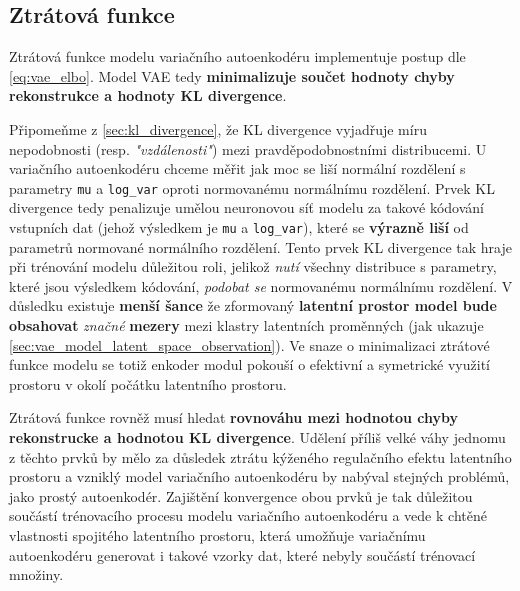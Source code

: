 \subsection{Ztrátová funkce}
\label{sec:vae_model_loss_function}
Ztrátová funkce modelu variačního autoenkodéru implementuje postup dle \autoref{eq:vae_elbo}.
Model VAE tedy \textbf{minimalizuje součet hodnoty chyby rekonstrukce a hodnoty KL divergence}.

Připomeňme z \autoref{sec:kl_divergence}, že KL divergence vyjadřuje míru nepodobnosti (resp. \emph{"vzdálenosti"}) mezi pravděpodobnostními distribucemi.
U variačního autoenkodéru chceme měřit jak moc se liší normální rozdělení s parametry \lstinline{mu} a \lstinline{log_var} oproti normovanému normálnímu rozdělení.
Prvek KL divergence tedy penalizuje umělou neuronovou síť modelu za takové kódování vstupních dat (jehož výsledkem je \lstinline{mu} a \lstinline{log_var}), které se \textbf{výrazně liší} od parametrů normované normálního rozdělení.
Tento prvek KL divergence tak hraje při trénování modelu důležitou roli, jelikož \emph{nutí} všechny distribuce s parametry, které jsou výsledkem kódování, \emph{podobat se} normovanému normálnímu rozdělení. 
V důsledku existuje \textbf{menší šance} že zformovaný \textbf{latentní prostor model bude obsahovat} \emph{značné} \textbf{mezery} mezi klastry latentních proměnných (jak ukazuje \autoref{sec:vae_model_latent_space_observation}).
Ve snaze o minimalizaci ztrátové funkce modelu se totiž enkoder modul pokouší o efektivní a symetrické využití prostoru v okolí počátku latentního prostoru.

Ztrátová funkce rovněž musí hledat \textbf{rovnováhu mezi hodnotou chyby rekonstrucke a hodnotou KL divergence}.
Udělení příliš velké váhy jednomu z těchto prvků by mělo za důsledek ztrátu kýženého regulačního efektu latentního prostoru a vzniklý model variačního autoenkodéru by nabýval stejných problémů, jako prostý autoenkodér.
Zajištění konvergence obou prvků je tak důležitou součástí trénovacího procesu modelu variačního autoenkodéru a vede k chtěné vlastnosti spojitého latentního prostoru, která umožňuje variačnímu autoenkodéru generovat i takové vzorky dat, které nebyly součástí trénovací množiny.



